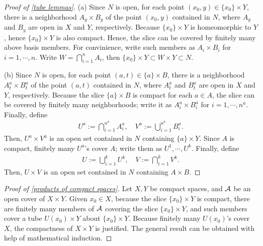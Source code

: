 \begin{proof}[Proof of \cref{tube lemmas}]
    \hangindent=0.65cm
    (a)
        Since $N$ is open, for each point $(x_0, y)\in\{x_0\}\times Y$, there is a neighborhood $A_y\times B_y$ of the point $(x_0, y)$ contained in $N$, where $A_y$ and $B_y$ are open in $X$ and $Y$, respectively.
        Because $\{x_0\}\times Y$ is homeomorphic to $Y$, hence $\{x_0\}\times Y$ is also compact.
        Hence, the slice can be covered by finitely many above basis members.
        For convinience, write such members as $A_i\times B_i$ for $i=1, \cdots, n$.
        Write $W=\bigcap_{i=1}^n A_i$, then $\{x_0\}\times Y\subset W\times Y\subset N$.
    
    \noindent(b)
        Since $N$ is open, for each point $(a, t)\in\{a\}\times B$, there is a neighborhood $A_t^a\times B_t^a$ of the point $(a, t)$ contained in $N$, where $A_t^a$ and $B_t^a$ are open in $X$ and $Y$, respectively.
        Because the slice $\{a\}\times B$ is compact for each $a\in A$, the slice can be covered by finitely many neighborhoods; write it as $A_i^a\times B_i^a$ for $i=1, \cdots, n^a$.
        Finally, define
        \begin{align*}
            U^a:=\bigcap_{i=1}^{n^a}{A_i^a},\quad V^a:=\bigcup_{i=1}^{n^a}{B_i^a}.
        \end{align*}
        Then, $U^a\times V^a$ is an open set contained in $N$ containing $\{a\}\times Y$.
        Since $A$ is compact, finitely many $U^a$'s cover $A$; write them as $U^1, \cdots, U^k$.
        Finally, define
        \begin{align*}
            U:=\bigcup_{i=1}^k U^k,\quad V:=\bigcap_{i=1}^k V^k.
        \end{align*}
        Then, $U\times V$ is an open set contained in $N$ containing $A\times B$.
\end{proof}
\begin{proof}[Proof of \cref{products of compact spaces}]
    Let $X, Y$ be compact spaces, and ${\mathcal{A}}$ be an open cover of $X\times Y$.
    Given $x_0\in X$, because the slice $\{x_0\}\times Y$ is compact, there are finitely many members of ${\mathcal{A}}$ covering the slice $\{x_0\}\times Y$, and such members cover a tube $U(x_0)\times Y$ about $\{x_0\}\times Y$.
    Because finitely many $U(x_0)$'s cover $X$, the compactness of $X\times Y$ is justified.
    The general result can be obtained with help of mathematical induction.
\end{proof}

